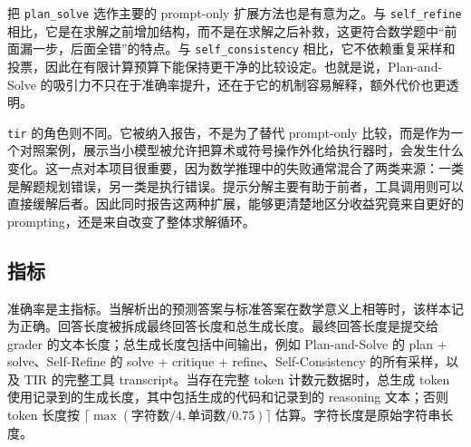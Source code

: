 \documentclass[conference]{IEEEtran}
\begin{document}
把 \texttt{plan\_solve} 选作主要的 prompt-only 扩展方法也是有意为之。与 \texttt{self\_refine} 相比，它是在求解之前增加结构，而不是在求解之后补救，这更符合数学题中“前面漏一步，后面全错”的特点。与 \texttt{self\_consistency} 相比，它不依赖重复采样和投票，因此在有限计算预算下能保持更干净的比较设定。也就是说，Plan-and-Solve 的吸引力不只在于准确率提升，还在于它的机制容易解释，额外代价也更透明。

\texttt{tir} 的角色则不同。它被纳入报告，不是为了替代 prompt-only 比较，而是作为一个对照案例，展示当小模型被允许把算术或符号操作外化给执行器时，会发生什么变化。这一点对本项目很重要，因为数学推理中的失败通常混合了两类来源：一类是解题规划错误，另一类是执行错误。提示分解主要有助于前者，工具调用则可以直接缓解后者。因此同时报告这两种扩展，能够更清楚地区分收益究竟来自更好的 prompting，还是来自改变了整体求解循环。

\begin{table}[t]
\centering
\caption{提示方法定义。}
\label{tab:methods}
\end{table}

\subsection{指标}
准确率是主指标。当解析出的预测答案与标准答案在数学意义上相等时，该样本记为正确。回答长度被拆成最终回答长度和总生成长度。最终回答长度是提交给 grader 的文本长度；总生成长度包括中间输出，例如 Plan-and-Solve 的 plan + solve、Self-Refine 的 solve + critique + refine、Self-Consistency 的所有采样，以及 TIR 的完整工具 transcript。当存在完整 token 计数元数据时，总生成 token 使用记录到的生成长度，其中包括生成的代码和记录到的 reasoning 文本；否则 token 长度按 $\lceil\max(\text{字符数}/4,\text{单词数}/0.75)\rceil$ 估算。字符长度是原始字符串长度。
\end{document}
